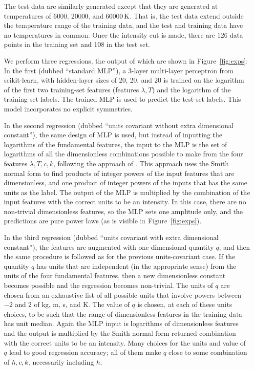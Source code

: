 \documentclass[accepted]{article}
\newcommand{\figref}[1]{Figure~\ref{#1}}
\begin{document}
The test data are similarly generated except that they are generated at temperatures of 6000, 20000, and 60000\,K.
That is, the test data extend outside the temperature range of the training data, and the test and training data have no temperatures in common.
Once the intensity cut is made, there are 126 data points in the training set and 108 in the test set.

We perform three regressions, the output of which are shown in \figref{fig:exps}:
In the first (dubbed ``standard MLP''), a 3-layer multi-layer perceptron from scikit-learn, with hidden-layer sizes of 20, 20, and 20 is trained on the logarithm of the first two training-set features (features $\lambda, T$) and the logarithm of the training-set labels.
The trained MLP is used to predict the test-set labels.
This model incorporates no explicit symmetries.

In the second regression (dubbed ``units covariant without extra dimensional constant''), the same design of MLP is used, but instead of inputting the logarithms of the fundamental features, the input to the MLP is the set of logarithms of all the dimensionless combinations possible to make from the four features $\lambda, T, c, k$, following the approach of \cite{villar2022dimensionless}.
This approach uses the Smith normal form \citep{stanley2016smithnormalform} to find products of integer powers of the input features that are dimensionless, and one product of integer powers of the inputs that has the same units as the label.
The output of the MLP is multiplied by the combination of the input features with the correct units to be an intensity.
In this case, there are no non-trivial dimensionless features, so the MLP sets one amplitude only, and the predictions are pure power laws (as is visible in \figref{fig:exps}).

In the third regression (dubbed ``units covariant with extra dimensional constant''), the features are augmented with one dimensional quantity $q$, and then the same procedure is followed as for the previous units-covariant case.
If the quantity $q$ has units that are independent (in the appropriate sense) from the units of the four fundamental features, then a new dimensionless constant becomes possible and the regression becomes non-trivial.
The units of $q$ are chosen from an exhaustive list of all possible units that involve powers between $-2$ and $2$ of kg, m, s, and K.
The value of $q$ is chosen, at each of these units choices, to be such that the range of dimensionless features in the training data has unit median.
Again the MLP input is logarithms of dimensionless features and the output is multiplied by the Smith normal form returned combination with the correct units to be an intensity.
Many choices for the units and value of $q$ lead to good regression accuracy; all of them make $q$ close to some combination of $h, c, k$, necessarily including $h$.
\end{document}
